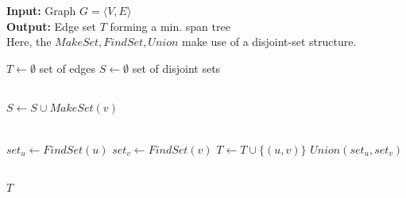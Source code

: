 \documentclass[12pt,a4paper]{article}
\begin{document}
	\begin{algorithm}
		\textbf{Input:} Graph $ G = \langle V, E \rangle $
		\\\textbf{Output:} Edge set $ T $ forming a min. span tree
		\\\Comment Here, the $ MakeSet, FindSet, Union $ make use of a disjoint-set structure.
		\begin{algorithmic}
				\State $ T \gets \emptyset $ \Comment set of edges
				\State $ S \gets \emptyset $ \Comment set of disjoint sets
				
				\\
					\State $ S \gets S \cup MakeSet(v) $
				\EndFor
				
				\\
					\State $ set_u \gets FindSet(u) $
					\State $ set_v \gets FindSet(v) $
						\State $ T \gets T \cup \{(u,v)\} $
						\State $ Union(set_u, set_v) $
					\EndIf
				\EndFor
				
				\\\Return $ T $
			\EndProcedure
		\end{algorithmic}
	\end{algorithm}
\end{document}
